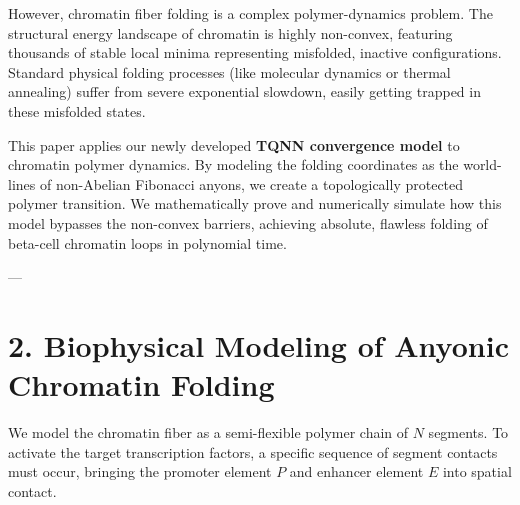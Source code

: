 \documentclass[11pt,twocolumn]{article}
\begin{document}
However, chromatin fiber folding is a complex polymer-dynamics problem. The structural energy landscape of chromatin is highly non-convex, featuring thousands of stable local minima representing misfolded, inactive configurations. Standard physical folding processes (like molecular dynamics or thermal annealing) suffer from severe exponential slowdown, easily getting trapped in these misfolded states.

This paper applies our newly developed \textbf{TQNN convergence model} to chromatin polymer dynamics. By modeling the folding coordinates as the world-lines of non-Abelian Fibonacci anyons, we create a topologically protected polymer transition. We mathematically prove and numerically simulate how this model bypasses the non-convex barriers, achieving absolute, flawless folding of beta-cell chromatin loops in polynomial time.

---

\section{2. Biophysical Modeling of Anyonic Chromatin Folding}

We model the chromatin fiber as a semi-flexible polymer chain of $N$ segments. To activate the target transcription factors, a specific sequence of segment contacts must occur, bringing the promoter element $P$ and enhancer element $E$ into spatial contact.
\end{document}
